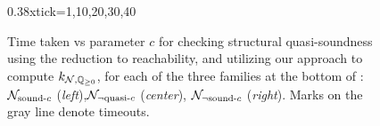 \begin{figure}
    \centering
    {0.38\textwidth}{xtick={1,10,20,30,40}}

    \ourshortlegend

    \caption{Time taken vs parameter $c$ for checking structural quasi-soundness using the reduction to reachability, and utilizing our approach to compute $k_{\mathcal{N},\mathbb{Q}_{\ge 0}}$, for each of the three families at the bottom of : $\mathcal{N}_{\text{sound-}c}$ (\emph{left}),$\mathcal{N}_{\neg \text{quasi-}c}$ (\emph{center}), $\mathcal{N}_{\neg \text{sound-}c}$ (\emph{right}).
        Marks on the gray line denote timeouts.}\label{fig:synth-struct-results}
\end{figure}
